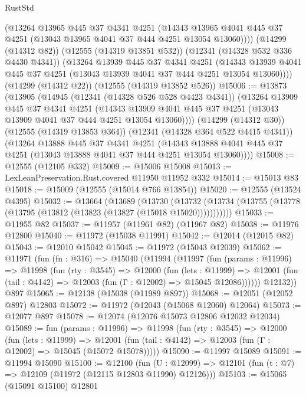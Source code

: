 \begin{lexlean}{RustStd}
\begin{coremodule}
        (@13264
          @13965
          @445
          @37
          @4341
          @4251
          (@14343 @13965 @4041 @445 @37 @4251 (@13043 @13965 @4041 @37 @444 @4251 @13054 @13060))))
      (@14299 (@14312 @82))
      (@12555 (@14319 @13851 @532))
      (@12341 (@14328 @532 @336 @4430 @4341))
      (@13264
        @13939
        @445
        @37
        @4341
        @4251
        (@14343 @13939 @4041 @445 @37 @4251 (@13043 @13939 @4041 @37 @444 @4251 @13054 @13060))))
    (@14299 (@14312 @22))
    (@12555 (@14319 @13852 @526))
@15006 := @13873
    (@13905
      (@14945
        (@12341 (@14328 @526 @528 @4423 @4341))
        (@13264
          @13909
          @445
          @37
          @4341
          @4251
          (@14343 @13909 @4041 @445 @37 @4251 (@13043 @13909 @4041 @37 @444 @4251 @13054 @13060))))
      (@14299 (@14312 @30))
      (@12555 (@14319 @13853 @364))
      (@12341 (@14328 @364 @522 @4415 @4341))
      (@13264
        @13888
        @445
        @37
        @4341
        @4251
        (@14343 @13888 @4041 @445 @37 @4251 (@13043 @13888 @4041 @37 @444 @4251 @13054 @13060))))
@15008 := @12555 (@12105 @332)
@15009 := @15006 @15008
@15013 := LexLeanPreservation.Rust.covered @11950 @11952 @332
@15014 := @15013 @83
@15018 := @15009 (@12555 (@15014 @766 @13854))
@15020 := @12555 (@13524 @4395)
@15032 := @13664
    (@13689
      (@13730
        (@13732 (@13734 (@13755 (@13778 (@13795 (@13812 (@13823 (@13827 (@15018 @15020)))))))))))
@15033 := @11955 @82
@15037 := @11957 (@11961 @82) (@11967 @82)
@15038 := @11976 @12800
@15040 := @11972 (@15038 @11991)
@15042 := @12014 (@12015 @82)
@15043 := @12010 @15042
@15045 := @11972 (@15043 @12039)
@15062 := @11971
    (fun (fn : @316) =>
    @15040
      (@11994
        (@11997
          (fun (params : @11996) =>
          @11998
            (fun (rty : @3545) =>
            @12000
              (fun (lets : @11999) =>
              @12001 (fun (tail : @4142) => @12003 (fun (Γ : @12002) => @15045 @12086))))))
        @12132))
    @897
@15065 := @12138 (@15038 (@11989 @897))
@15068 := @12051 (@12052 @897) @12803
@15072 := @11972 (@12043 (@15068 @12060) @12064)
@15073 := @12077 @897
@15078 := @12074 (@12076 @15073 @12806 @12032 @12034)
@15089 := fun (params : @11996) =>
  @11998
    (fun (rty : @3545) =>
    @12000
      (fun (lets : @11999) =>
      @12001 (fun (tail : @4142) => @12003 (fun (Γ : @12002) => @15045 (@15072 @15078)))))
@15090 := @11997 @15089
@15091 := @11994 @15090
@15100 := @12100
    (fun (U : @12099) => @12101 (fun (t : @7) => @12109 (@11972 (@12115 @12803 @11990) @12126)))
@15103 := @15065 (@15091 @15100) @12801

\end{coremodule}
\end{lexlean}
